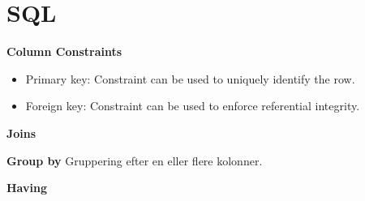 \section{SQL}


\textbf{Column Constraints}
\begin{itemize}
	\item{Primary key: Constraint can be used to uniquely identify the row.}
	\item{Foreign key: Constraint can be used to enforce referential integrity.}
\end{itemize}

\textbf{Joins}



\textbf{Group by}
Gruppering efter en eller flere kolonner.


\textbf{Having}

